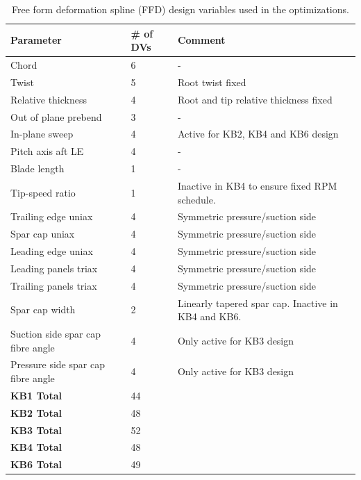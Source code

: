 \begin{table}[pth]
\centering
\caption{Free form deformation spline (FFD) design variables used in the optimizations.}
\small
\begin{tabular}{p{5cm}lp{6cm}}
\hline
\textbf{Parameter}		&	\# of DVs			& \textbf{Comment}	\\
\hline
Chord					&	6	&	-	\\
Twist					&	5	&	Root twist fixed	\\
Relative thickness		&	4	& 	Root and tip relative thickness fixed	\\
Out of plane prebend		&	3	& 	- \\
In-plane sweep			&	4	&	Active for KB2, KB4 and KB6 design \\
Pitch axis aft LE		&	4	& 	- \\
Blade length				&	1	&	- \\
Tip-speed ratio			&	1	&	Inactive in KB4 to ensure fixed RPM schedule. \\
Trailing edge uniax		&	4	&	Symmetric pressure/suction side	\\
Spar cap uniax			&	4	&	Symmetric pressure/suction side	\\
Leading edge uniax		&	4	&	Symmetric pressure/suction side	\\
Leading panels triax		&	4	&	Symmetric pressure/suction side	\\
Trailing panels triax	&	4	&	Symmetric pressure/suction side	\\
Spar cap width			& 	2	&	Linearly tapered spar cap. Inactive in KB4 and KB6. \\
Suction side spar cap fibre angle	&	4	&	Only active for KB3 design	\\
Pressure side spar cap fibre angle	&	4	&	Only active for KB3 design	\\
\hline
\textbf{KB1 Total}		&	44	&	\\
\textbf{KB2 Total}		&	48	&	\\
\textbf{KB3 Total}		&	52	&	\\
\textbf{KB4 Total}		&	48	&	\\
\textbf{KB6 Total}		&	49	&	\\
\hline
\end{tabular}
\label{tab:dv_summary}
\end{table}

